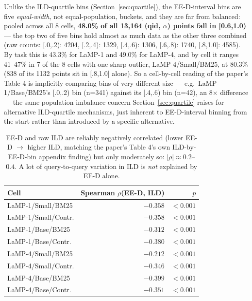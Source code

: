 \documentclass[10pt]{article}
\begin{document}
Unlike the ILD-quartile bins (Section~\ref{sec:quartile}), the EE-D-interval bins
are five \emph{equal-width}, not equal-population, buckets, and they are far from
balanced: pooled across all 8 cells, \textbf{48.0\% of all 13{,}164 (qid,
$\alpha$) points fall in [0.6,1.0)} --- the top two of five bins hold almost as
much data as the other three combined (raw counts: [.0,.2){:} 4204, [.2,.4){:}
1329, [.4,.6){:} 1306, [.6,.8){:} 1740, [.8,1.0]{:} 4585). By task this is 43.3\%
for LaMP-1 and 49.0\% for LaMP-4, and by cell it ranges 41--47\% in 7 of the 8
cells with one sharp outlier, LaMP-4/Small/BM25, at 80.3\% (838 of its 1132
points sit in [.8,1.0] alone). So a cell-by-cell reading of the paper's Table 4
is implicitly comparing bins of very different size --- e.g.\ LaMP-1/Base/BM25's
[.0,.2) bin (n{=}341) against its [.4,.6) bin (n{=}42), an 8$\times$ difference ---
the same population-imbalance concern Section~\ref{sec:quartile} raises for
alternative ILD-quartile mechanisms, just inherent to EE-D-interval binning from
the start rather than introduced by a specific alternative.

\begin{table}[h]
\centering
\small
\begin{tabular}{@{}lrr@{}}
\toprule
Cell & Spearman $\rho$(EE-D, ILD) & $p$ \\
\midrule
LaMP-1/Small/BM25   & $-0.358$ & $<0.001$ \\
LaMP-1/Small/Contr. & $-0.358$ & $<0.001$ \\
LaMP-1/Base/BM25    & $-0.312$ & $<0.001$ \\
LaMP-1/Base/Contr.  & $-0.380$ & $<0.001$ \\
LaMP-4/Small/BM25   & $-0.212$ & $<0.001$ \\
LaMP-4/Small/Contr. & $-0.346$ & $<0.001$ \\
LaMP-4/Base/BM25    & $-0.399$ & $<0.001$ \\
LaMP-4/Base/Contr.  & $-0.351$ & $<0.001$ \\
\bottomrule
\end{tabular}
\caption{EE-D and raw ILD are reliably negatively correlated (lower EE-D $\to$
higher ILD, matching the paper's Table 4's own ILD-by-EE-D-bin appendix finding) but only
moderately so: $|\rho|\approx 0.2$--$0.4$. A lot of query-to-query variation in ILD
is \emph{not} explained by EE-D alone.}
\label{tab:eed-ild-corr}
\end{table}
\end{document}
